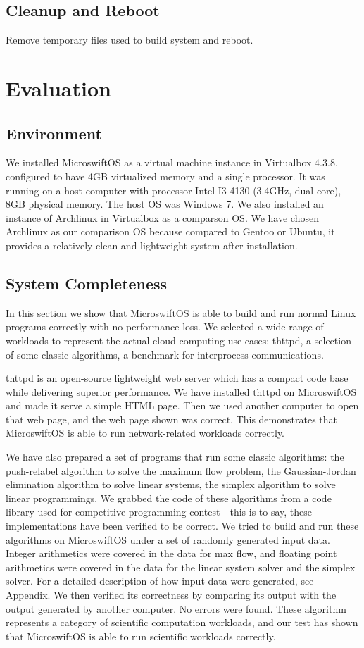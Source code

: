 \subsection{Cleanup and Reboot}
Remove temporary files used to build system and reboot.

\section{Evaluation}
\label{sec:eval}
\subsection{Environment}
We installed MicroswiftOS as a virtual machine instance in Virtualbox 4.3.8, configured to have 4GB virtualized memory and a single processor. It was running on a host computer with processor Intel I3-4130 (3.4GHz, dual core), 8GB physical memory. The host OS was Windows 7. We also installed an instance of Archlinux in Virtualbox as a comparson OS. We have chosen Archlinux as our comparison OS because compared to Gentoo or Ubuntu, it provides a relatively clean and lightweight system after installation.
\subsection{System Completeness}

In this section we show that MicroswiftOS is able to build and run normal Linux programs correctly with no performance loss. We selected a wide range of workloads to represent the actual cloud computing use cases: thttpd, a selection of some classic algorithms, a benchmark for interprocess communications.

thttpd is an open-source lightweight web server which has a compact code base while delivering superior performance. We have installed thttpd on MicroswiftOS and made it serve a simple HTML page. Then we used another computer to open that web page, and the web page shown was correct. This demonstrates that MicroswiftOS is able to run network-related workloads correctly.

We have also prepared a set of programs that run some classic algorithms: the push-relabel algorithm to solve the maximum flow problem, the Gaussian-Jordan elimination algorithm to solve linear systems, the simplex algorithm to solve linear programmings. We grabbed the code of these algorithms from a code library used for competitive programming contest - this is to say, these implementations have been verified to be correct. We tried to build and run these algorithms on MicroswiftOS under a set of randomly generated input data. Integer arithmetics were covered in the data for max flow, and floating point arithmetics were covered in the data for the linear system solver and the simplex solver. For a detailed description of how input data were generated, see Appendix. We then verified its correctness by comparing its output with the output generated by another computer. No errors were found. These algorithm represents a category of scientific computation workloads, and our test has shown that MicroswiftOS is able to run scientific workloads correctly.

